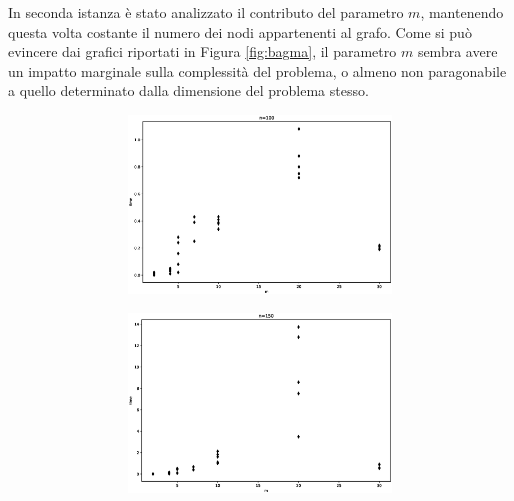 In seconda istanza è stato analizzato il contributo del parametro $m$, mantenendo questa volta costante il numero dei nodi appartenenti al grafo. Come si può evincere dai grafici riportati in Figura \ref{fig:bagma}, il parametro $m$ sembra avere un impatto marginale sulla complessità del problema, o almeno non paragonabile a quello determinato dalla dimensione del problema stesso. 


\begin{figure}[h!]
     \centering
     \begin{subfigure}[b]{\textwidth}
     	\centering
	     \begin{subfigure}[b]{0.32\textwidth}
	         \includegraphics[width=\columnwidth]{images/bagm0.eps}
	     \end{subfigure}
	     \hspace{0em}
	     \begin{subfigure}[b]{0.32\textwidth}
	         \includegraphics[width=\columnwidth]{images/bagm1.eps}

\end{subfigure}
\end{subfigure}
\end{figure}
